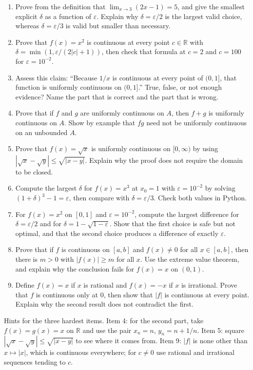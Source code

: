 \begin{latihan}
\begin{enumerate}
  \item Prove from the definition that $\lim_{x\to 3}(2x-1)=5$, and give the smallest
        explicit $\delta$ as a function of $\varepsilon$. Explain why
        $\delta=\varepsilon/2$ is the largest valid choice, whereas
        $\delta=\varepsilon/3$ is valid but smaller than necessary.
  \item Prove that $f(x)=x^{2}$ is continuous at every point $c\in\mathbb{R}$ with
        $\delta=\min(1,\varepsilon/(2|c|+1))$, then check that formula at $c=2$ and
        $c=100$ for $\varepsilon=10^{-2}$.
  \item Assess this claim: ``Because $1/x$ is continuous at every point of $(0,1]$, that
        function is uniformly continuous on $(0,1]$.'' True, false, or not enough
        evidence? Name the part that is correct and the part that is wrong.
  \item Prove that if $f$ and $g$ are uniformly continuous on $A$, then $f+g$ is uniformly
        continuous on $A$. Show by example that $fg$ need not be uniformly
        continuous on an unbounded $A$.
  \item Prove that $f(x)=\sqrt{x}$ is uniformly continuous on $[0,\infty)$ by
        using $|\sqrt{x}-\sqrt{y}|\le\sqrt{|x-y|}$. Explain why the proof does not
        require the domain to be closed.
  \item Compute the largest $\delta$ for $f(x)=x^{3}$ at $x_{0}=1$ with
        $\varepsilon=10^{-2}$ by solving $(1+\delta)^{3}-1=\varepsilon$, then
        compare with $\delta=\varepsilon/3$. Check both values in Python.
  \item For $f(x)=x^{2}$ on $[0,1]$ and $\varepsilon=10^{-2}$, compute the largest
        difference for $\delta=\varepsilon/2$ and for $\delta=1-\sqrt{1-\varepsilon}$.
        Show that the first choice is safe but not optimal, and that the second
        choice produces a difference of exactly $\varepsilon$.
  \item Prove that if $f$ is continuous on $[a,b]$ and $f(x)\neq 0$ for all
        $x\in[a,b]$, then there is $m>0$ with $|f(x)|\ge m$ for all $x$. Use the
        extreme value theorem, and explain why the conclusion fails for
        $f(x)=x$ on $(0,1)$.
  \item Define $f(x)=x$ if $x$ is rational and $f(x)=-x$ if $x$ is irrational.
        Prove that $f$ is continuous only at $0$, then show that $|f|$ is continuous at
        every point. Explain why the second result does not contradict the first.
\end{enumerate}

Hints for the three hardest items. Item 4: for the second part, take $f(x)=g(x)=x$
on $\mathbb{R}$ and use the pair $x_{n}=n$, $y_{n}=n+1/n$. Item 5: square
$|\sqrt{x}-\sqrt{y}|\le\sqrt{|x-y|}$ to see where it comes from. Item 9: $|f|$ is none
other than $x\mapsto|x|$, which is continuous everywhere; for $c\neq0$ use rational
and irrational sequences tending to $c$.
\end{latihan}

